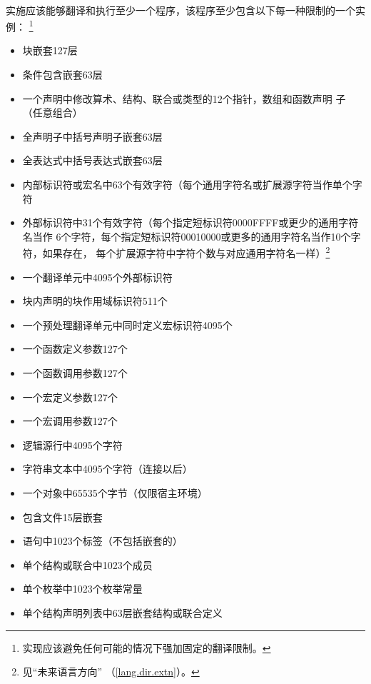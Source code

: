 \paragraph{}
实施应该能够翻译和执行至少一个程序，该程序至少包含以下每一种限制的一个实例：
\footnote{实现应该避免任何可能的情况下强加固定的翻译限制。}
\begin{itemize}
  \item{块嵌套127层}
  \item{条件包含嵌套63层}
  \item{一个声明中修改算术、结构、联合或类型的12个指针，数组和函数声明
     子（任意组合）}
  \item{全声明子中括号声明子嵌套63层}
  \item{全表达式中括号表达式嵌套63层}
  \item{内部标识符或宏名中63个有效字符（每个通用字符名或扩展源字符当作单个字符}
  \item{外部标识符中31个有效字符（每个指定短标识符0000FFFF或更少的通用字符名当作
    6个字符，每个指定短标识符00010000或更多的通用字符名当作10个字符，如果存在，
    每个扩展源字符中字符个数与对应通用字符名一样）\footnote{见``未来语言方向''
    （\ref{lang.dir.extn}）。}}
  \item{一个翻译单元中4095个外部标识符}
  \item{块内声明的块作用域标识符511个}
  \item{一个预处理翻译单元中同时定义宏标识符4095个}
  \item{一个函数定义参数127个}
  \item{一个函数调用参数127个}
  \item{一个宏定义参数127个}
  \item{一个宏调用参数127个}
  \item{逻辑源行中4095个字符}
  \item{字符串文本中4095个字符（连接以后）}
  \item{一个对象中65535个字节（仅限宿主环境）}
  \item{包含文件15层嵌套}
  \item{语句中1023个标签（不包括嵌套的）}
  \item{单个结构或联合中1023个成员}
  \item{单个枚举中1023个枚举常量}
  \item{单个结构声明列表中63层嵌套结构或联合定义}
\end{itemize}


